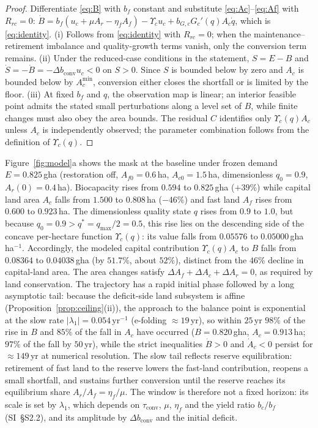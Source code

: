 \documentclass[preprint,12pt,authoryear]{elsarticle}
\newcommand{\dconv}{\Delta b_{\mathrm{conv}}}
\newcommand{\Ups}{\Upsilon_c}
\newcommand{\Acmin}{A_c^{\min}}
\newcommand{\tconv}{\tau_{\mathrm{conv}}}
\begin{document}
\begin{proof}
Differentiate \eqref{eq:B} with $b_f$ constant and substitute \eqref{eq:Ac}--\eqref{eq:Af} with $R_{rc}=0$: $\dot B=b_f(u_c+\mu A_r-\eta_fA_f)-\Ups u_c+b_{G,c}G_c'(q)A_c\dot q$, which is \eqref{eq:identity}. (i) Follows from \eqref{eq:identity} with $R_{rc}=0$; when the maintenance--retirement imbalance and quality-growth terms vanish, only the conversion term remains. (ii) Under the reduced-case conditions in the statement, $S=E-B$ and $\dot S=-\dot B=-\dconv u_c<0$ on $S>0$. Since $S$ is bounded below by zero and $A_c$ is bounded below by $\Acmin$, conversion either closes the shortfall or is limited by the floor. (iii) At fixed $b_f$ and $q$, the observation map is linear; an interior feasible point admits the stated small perturbations along a level set of $B$, while finite changes must also obey the area bounds. The residual $C$ identifies only $\Ups(q)A_c$ unless $A_c$ is independently observed; the parameter combination follows from the definition of $\Ups(q)$.
\end{proof}

Figure~\ref{fig:model}a shows the mask at the baseline under frozen demand $E=0.825$\,gha (restoration off, $A_{f0}=0.6$\,ha, $A_{c0}=1.5$\,ha, dimensionless $q_0=0.9$, $A_r(0)=0.4$\,ha). Biocapacity rises from $0.594$ to $0.825$\,gha ($+39\%$) while capital land area $A_c$ falls from $1.500$ to $0.808$\,ha ($-46\%$) and fast land $A_f$ rises from $0.600$ to $0.923$\,ha. The dimensionless quality state $q$ rises from $0.9$ to $1.0$, but because $q_0=0.9>q^*=q_{\max}/2=0.5$, this rise lies on the descending side of the concave per-hectare function $\Ups(q)$: its value falls from $0.05576$ to $0.05000$\,gha\,ha$^{-1}$. Accordingly, the modeled capital contribution $\Ups(q)A_c$ to $B$ falls from $0.08364$ to $0.04038$\,gha (by $51.7\%$, about $52\%$), distinct from the $46\%$ decline in capital-land area. The area changes satisfy $\Delta A_f+\Delta A_c+\Delta A_r=0$, as required by land conservation. The trajectory has a rapid initial phase followed by a long asymptotic tail: because the deficit-side land subsystem is affine (Proposition~\ref{prop:ceiling}(ii)), the approach to the balance point is exponential at the slow rate $|\lambda_1|=0.054\,\mathrm{yr}^{-1}$ (e-folding $\approx19$\,yr), so within $25$\,yr $98\%$ of the rise in $B$ and $85\%$ of the fall in $A_c$ have occurred ($B=0.820$\,gha, $A_c=0.913$\,ha; $97\%$ of the fall by $50$\,yr), while the strict inequalities $\dot B>0$ and $\dot A_c<0$ persist for $\approx149$\,yr at numerical resolution. The slow tail reflects reserve equilibration: retirement of fast land to the reserve lowers the fast-land contribution, reopens a small shortfall, and sustains further conversion until the reserve reaches its equilibrium share $A_r/A_f=\eta_f/\mu$. The window is therefore not a fixed horizon: its scale is set by $\lambda_1$, which depends on $\tconv$, $\mu$, $\eta_f$ and the yield ratio $b_c/b_f$ (SI~\S S2.2), and its amplitude by $\dconv$ and the initial deficit.
\end{document}
